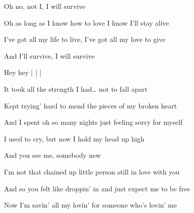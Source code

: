 \begin{song}
\begin{chorusboxwide}{\PrechorusAndChorus}
\bigskip

Oh no, not I, I will survive \par
Oh as long as I know how to love I know I'll stay alive \par
I've got all my life to live, I've got all my love to give \par
And I'll survive, I will survive \par

\bigskip

Hey hey  |   |   |   \par
\end{chorusboxwide}

\bigskip

It took all the strength I had… not to fall apart \par
Kept trying' hard to mend the pieces of my broken heart \par
And I spent oh so many nights just feeling sorry for myself \par
I used to cry, but now I hold my head up high \par

\bigskip

And you see me, somebody new \par
I'm not that chained up little person still in love with you \par
And so you felt like droppin' in and just expect me to be free \par
Now I'm savin' all my lovin' for someone who's lovin' me \par

\bigskip

\PrechorusAndChorus

\bigskip

 \par

\end{song}